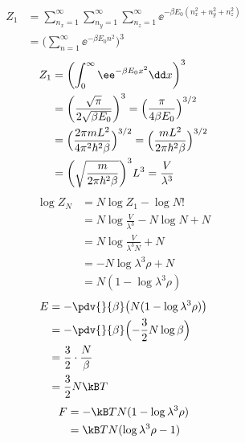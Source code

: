 \begin{align*}
Z_1&=\sum_{n_x=1}^{\infty}\sum_{n_y=1}^{\infty}\sum_{n_z=1}^{\infty}\ee^{-\beta E_0(n_x^{2}+n_y^{2}+n_z^{2})}\\
&=\biggl(\sum_{n=1}^{\infty}\ee^{-\beta E_0n^{2}}\biggr)^{3}
\end{align*}
\begin{align*}
Z_1&=\biggl(\int_{0}^{\infty}\ee^{-\beta E_0x^{2}}\dd x\biggr)^{3}\\
&=\biggl(\frac{\sqrt{\pi}}{2\sqrt{\beta E_0}}\biggr)^{3}=\Bigl(\frac{\pi}{4\beta E_0}\Bigr)^{3/2}\\
&=\Bigl(\frac{2\pi mL^{2}}{4\pi^{2}\hbar^{2}\beta}\Bigr)^{3/2}=\Bigl(\frac{mL^{2}}{2\pi\hbar^{2}\beta}\Bigr)^{3/2}\\
&=\biggl(\sqrt{\frac{m}{2\pi\hbar^{2}\beta}}\biggr)^{3}L^{3}=\frac{V}{\lambda^{3}}
\end{align*}
\begin{align*}
\log Z_N&=N\log Z_1-\log N!\\
&=N\log\frac{V}{\lambda^{3}}-N\log N+N\\
&=N\log\frac{V}{\lambda^{3}N}+N\\
&=-N\log\lambda^{3}\rho+N\\
&=N(1-\log\lambda^{3}\rho)
\end{align*}
\begin{align*}
E&=-\pdv{}{\beta}\bigl(N(1-\log\lambda^{3}\rho)\bigr)\\
&=-\pdv{}{\beta}\Bigl(-\frac{3}{2}N\log\beta\Bigr)\\
&=\frac{3}{2}\cdot\frac{N}{\beta}\\
&=\frac{3}{2}N\kB T
\end{align*}
\begin{align*}
F&=-\kB TN(1-\log\lambda^{3}\rho)\\
&=\kB TN(\log\lambda^{3}\rho-1)
\end{align*}
